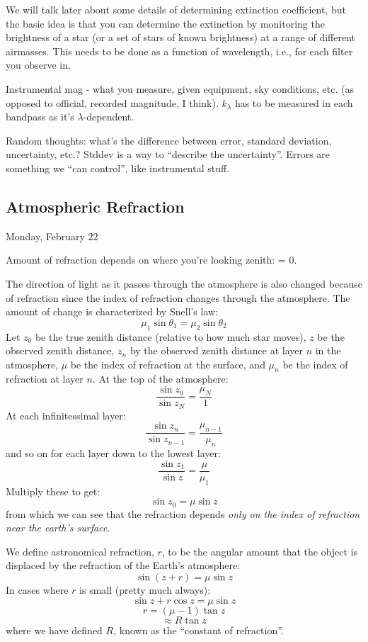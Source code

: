 \documentclass[12pt]{article}
\begin{document}
We will talk later about some details of determining extinction
coefficient, but the basic idea is that you can determine the
extinction by monitoring the brightness of a star (or a set of stars
of known brightness) at a range of different airmasses. This needs to
be done as a function of wavelength, i.e., for each filter you observe
in.

\textcolor{myBlue}{Instrumental mag - what you measure, given
    equipment, sky conditions, etc. (as opposed to official, recorded
    magnitude, I think). $k_{\lambda}$ has to be measured in each
    bandpass as it's $\lambda$-dependent.
}

\textcolor{myBlue}{Random thoughts: what's the difference between
    error, standard deviation, uncertainty, etc.?
    Stddev is a way to ``describe the uncertainty''. Errors are
    something we ``can control'', like instrumental stuff.
}

\subsection{Atmospheric Refraction}
\textcolor{date}{Monday, February 22}

\textcolor{myBlue}{Amount of refraction depends on where you're looking
zenith: = 0}.

The direction of light as it passes through the atmosphere is also
changed because of refraction since the index of refraction changes
through the atmosphere. The amount of change is characterized by
Snell's law:
    $$ \mu_1\sin\theta_1 = \mu_2\sin\theta_2 $$
Let $z_0$ be the true zenith distance (relative to how much
star moves), $z$ be the observed zenith
distance, $z_n$ by the observed zenith distance at layer $n$ in the
atmosphere, $\mu$ be the index of refraction at the surface, and
$\mu_n$ be the index of refraction at layer $n$. At the top of the
atmosphere:
    $$ \frac{\sin z_0}{\sin z_N} = \frac{\mu_N}{1} $$
At each infinitessimal layer:
    $$ \frac{\sin z_n}{\sin z_{n-1}} = \frac{\mu_{n-1}}{\mu_n}  $$
and so on for each layer down to the lowest layer:
    $$ \frac{\sin z_1}{\sin z} = \frac{\mu}{\mu_1}  $$
Multiply these to get:
    $$ \sin z_0 = \mu\sin z  $$
from which we can see that the refraction depends
\emph{only on the index of refraction near the earth's surface}.

We define astronomical refraction, $r$, to be the angular amount that
the object is displaced by the refraction of the Earth's atmosphere:
    $$ \sin(z+r) = \mu\sin z $$
In cases where $r$ is small (pretty much always):
    $$ \sin z + r\cos z = \mu\sin z $$
    $$ r = (\mu-1) \tan z $$
    $$ \approx R\tan z $$
where we have defined $R$, known as the ``constant of refraction''.
\end{document}
